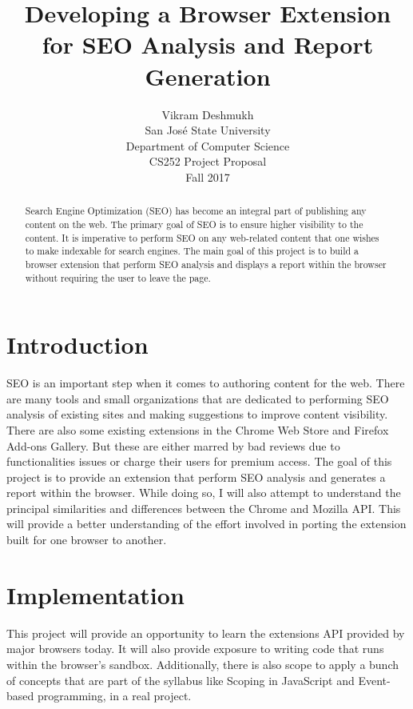 \documentclass{article}
\title{Developing a Browser Extension for SEO Analysis and Report Generation}
\author{
  Vikram Deshmukh \\
  San Jos\'{e} State University \\
  Department of Computer Science \\
  CS252 Project Proposal \\
  Fall 2017
  \bigskip
  }
\begin{document}
\bigskip
\maketitle
\bigskip
\bigskip
\begin{abstract}
Search Engine Optimization (SEO) has become an integral part of publishing any content on the web. The primary goal of SEO is to ensure higher visibility to the content. It is imperative to perform SEO on any web-related content that one wishes to make indexable for search engines. The main goal of this project is to build a browser extension that perform SEO analysis and displays a report within the browser without requiring the user to leave the page.
\end{abstract}

\smallskip

\pagebreak
\section{Introduction}
SEO is an important step when it comes to authoring content for the web. There are many tools and small organizations that are dedicated to performing SEO analysis of existing sites and making suggestions to improve content visibility. There are also some existing extensions in the Chrome Web Store and Firefox Add-ons Gallery. But these are either marred by bad reviews due to functionalities issues or charge their users for premium access. The goal of this project is to provide an extension that perform SEO analysis and generates a report within the browser. While doing so, I will also attempt to understand the principal similarities and differences between the Chrome and Mozilla API. This will provide a better understanding of the effort involved in porting the extension built for one browser to another.


\smallskip

\section{Implementation}
This project will provide an opportunity to learn the extensions API provided by major browsers today. It will also provide exposure to writing code that runs within the browser's sandbox. Additionally, there is also scope to apply a bunch of concepts that are part of the syllabus like Scoping in JavaScript and Event-based programming, in a real project.


\smallskip
\end{document}
